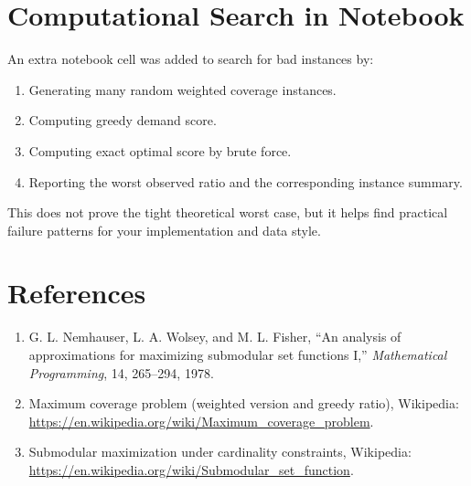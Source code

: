 \documentclass[11pt]{article}
\begin{document}
\section{Computational Search in Notebook}
An extra notebook cell was added to search for bad instances by:
\begin{enumerate}
\item Generating many random weighted coverage instances.
\item Computing greedy demand score.
\item Computing exact optimal score by brute force.
\item Reporting the worst observed ratio and the corresponding instance summary.
\end{enumerate}

This does not prove the tight theoretical worst case, but it helps find practical failure patterns for your implementation and data style.

\section{References}
\begin{enumerate}
\item G. L. Nemhauser, L. A. Wolsey, and M. L. Fisher, ``An analysis of approximations for maximizing submodular set functions I,'' \emph{Mathematical Programming}, 14, 265--294, 1978.
\item Maximum coverage problem (weighted version and greedy ratio), Wikipedia: \url{https://en.wikipedia.org/wiki/Maximum_coverage_problem}.
\item Submodular maximization under cardinality constraints, Wikipedia: \url{https://en.wikipedia.org/wiki/Submodular_set_function}.
\end{enumerate}
\end{document}
